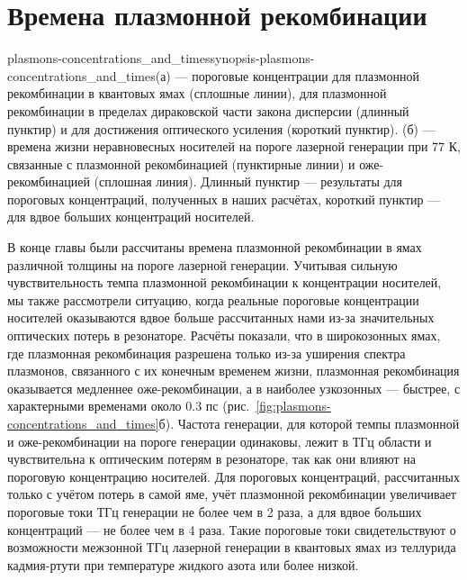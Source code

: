 \section{Времена плазмонной рекомбинации} \label{sec:plasmon-recombination_times}
\begin{fig}{plasmons-concentrations_and_times}{synopsis-plasmons-concentrations_and_times}(а) --- пороговые концентрации для плазмонной рекомбинации в квантовых ямах \HgCdTe{} (сплошные линии), для плазмонной рекомбинации в пределах дираковской части закона дисперсии (длинный пунктир) и для достижения оптического усиления (короткий пунктир). (б) --- времена жизни неравновесных носителей на пороге лазерной генерации при 77 К, связанные с плазмонной рекомбинацией (пунктирные линии) и оже-рекомбинацией (сплошная линия). Длинный пунктир --- результаты для пороговых концентраций, полученных в наших расчётах, короткий пунктир --- для вдвое больших концентраций носителей.
\end{fig}

В конце главы были рассчитаны времена плазмонной рекомбинации в ямах различной толщины на пороге лазерной генерации. Учитывая сильную чувствительность темпа плазмонной рекомбинации к концентрации носителей, мы также рассмотрели ситуацию, когда реальные пороговые концентрации носителей оказываются вдвое больше рассчитанных нами из-за значительных оптических потерь в резонаторе. Расчёты показали, что в широкозонных ямах, где плазмонная рекомбинация разрешена только из-за уширения спектра плазмонов, связанного с их конечным временем жизни, плазмонная рекомбинация оказывается медленнее оже-рекомбинации, а в наиболее узкозонных --- быстрее, с характерными временами около 0.3 пс (рис.~\ref{fig:plasmons-concentrations_and_times}б). Частота генерации, для которой темпы плазмонной и оже-рекомбинации на пороге генерации одинаковы, лежит в ТГц области и чувствительна к оптическим потерям в резонаторе, так как они влияют на пороговую концентрацию носителей. Для пороговых концентраций, рассчитанных только с учётом потерь в самой яме, учёт плазмонной рекомбинации увеличивает пороговые токи ТГц генерации не более чем в 2 раза, а для вдвое больших концентраций --- не более чем в 4 раза. Такие пороговые токи свидетельствуют о возможности межзонной ТГц лазерной генерации в квантовых ямах из теллурида кадмия-ртути при температуре жидкого азота или более низкой.